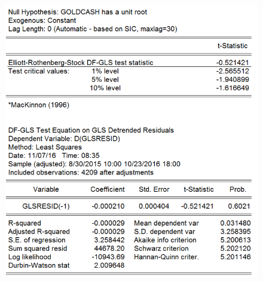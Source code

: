 \documentclass[11pt]{report}
\begin{document}
\begin{figure}[!h]
\includegraphics[scale=0.5]{Appendix/chap2/7}
\end{figure}
\clearpage
\end{document}

